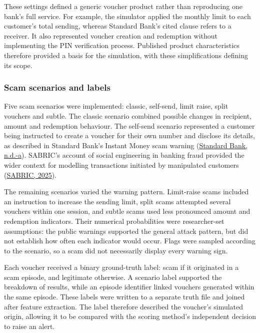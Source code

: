 \documentclass[11pt,a4paper]{article}
\begin{document}
These settings defined a generic voucher product rather than reproducing one bank's full service. For example, the simulator applied the monthly limit to each customer's total sending, whereas Standard Bank's cited clause refers to a receiver. It also represented voucher creation and redemption without implementing the PIN verification process. Published product characteristics therefore provided a basis for the simulation, with these simplifications defining its scope.

\subsubsection*{Scam scenarios and labels}

Five scam scenarios were implemented: classic, self-send, limit raise, split vouchers and subtle. The classic scenario combined possible changes in recipient, amount and redemption behaviour. The self-send scenario represented a customer being instructed to create a voucher for their own number and disclose its details, as described in Standard Bank's Instant Money scam warning (\href{https://www.standardbank.co.za/southafrica/personal/products-and-services/security-centre/bank-safely/scams}{Standard Bank, n.d.-a}). SABRIC's account of social engineering in banking fraud provided the wider context for modelling transactions initiated by manipulated customers (\href{https://www.sabric.co.za/wp-content/uploads/2025/09/CRIME-STATISTICS-REPORT-2024.pdf}{SABRIC, 2025}).

The remaining scenarios varied the warning pattern. Limit-raise scams included an instruction to increase the sending limit, split scams attempted several vouchers within one session, and subtle scams used less pronounced amount and redemption indicators. Their numerical probabilities were researcher-set assumptions: the public warnings supported the general attack pattern, but did not establish how often each indicator would occur. Flags were sampled according to the scenario, so a scam did not necessarily display every warning sign.

Each voucher received a binary ground-truth label: scam if it originated in a scam episode, and legitimate otherwise. A scenario label supported the breakdown of results, while an episode identifier linked vouchers generated within the same episode. These labels were written to a separate truth file and joined after feature extraction. The label therefore described the voucher's simulated origin, allowing it to be compared with the scoring method's independent decision to raise an alert.
\end{document}
